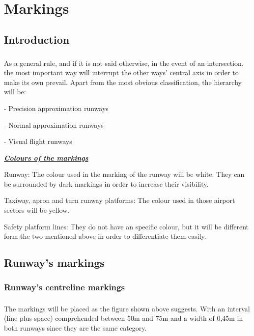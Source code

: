 \chapter{Markings}
	\section{Introduction}
	\paragraph{}As a general rule, and if it is not said otherwise, in the event of an intersection, the most important way will interrupt the other ways’ central axis in order to make its own prevail. Apart from the most obvious classification, the hierarchy will be:
	
	-	Precision approximation runways
	
	-	Normal approximation runways
	
	-	Visual flight runways
	
	\underline{\textbf{\textit{Colours of the markings}}}
	
	Runway: The colour used in the marking of the runway will be white. They can be surrounded by dark markings in order to increase their visibility.
	
	Taxiway, apron and turn runway platforms:  The colour used in those airport sectors will be yellow. 
	
	Safety platform lines: They do not have an specific colour, but it will be different form the two mentioned above in order to differentiate them easily.
	 
	\section{Runway's markings}
		\subsection{Runway's centreline markings}
		\paragraph{}The markings will be placed as the figure shown above suggests. With an interval (line plus space) comprehended between 50m and 75m and a width of 0,45m in both runways since they are the same category.
		
